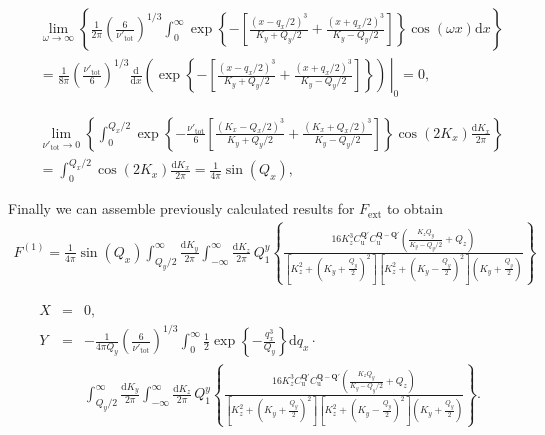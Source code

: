 \documentclass[a4paper,11pt]{article}
\begin{document}
\begin{eqnarray}
&& \lim_{\omega \rightarrow \infty} \left\{ \frac1{2\pi}\left(\frac{6}{\nu'_\mathrm{tot}}\right)^{1/3}\int_{0}^\infty \exp\left\{-\left[\frac{(x-q_x/2)^3}{K_y+Q_y/2}+\frac{(x+q_x/2)^3}{K_y-Q_y/2}\right]\right\} \cos(\omega x) \mathrm{d}x  \right\} \nonumber \\
&& {}= \frac1{8\pi} \left(\frac{\nu'_\mathrm{tot}}{6}\right)^{1/3} \left. \frac{\mathrm{d}}{\mathrm{d}x}  \left(\exp\left\{-\left[\frac{(x-q_x/2)^3}{K_y+Q_y/2}+\frac{(x+q_x/2)^3}{K_y-Q_y/2}\right]\right\}\right) \, \right|_0 = 0,
\end{eqnarray}

\begin{eqnarray}
&&\lim_{\nu'_{\mathrm{tot}} \rightarrow 0} \left\{ \int_0^{Q_x/2} \exp\left\{ -\frac{\nu'_{\mathrm{tot}}}{6}\left[\frac{(K_x-Q_x/2)^3}{K_y+Q_y/2}+\frac{(K_x+Q_x/2)^3}{K_y-Q_y/2}\right]\right\} \cos(2K_x) \frac{\mathrm{d}K_x}{2\pi} \right\} \nonumber\\
&& {}= \int_0^{Q_x/2} \cos(2K_x) \frac{\mathrm{d}K_x}{2\pi} = \frac1{4\pi}\sin(Q_x),
\end{eqnarray}



Finally we can assemble previously calculated results for $F_\mathrm{ext}$ to obtain
\begin{eqnarray*}
 F^{(1)} =  \frac1{4\pi}\sin(Q_x) \int_{Q_y/2}^\infty \frac{\mathrm{d}K_y}{2\pi} \int_{-\infty}^\infty \frac{\mathrm{d}K_z}{2\pi} \, Q_1^y 
  \left\{ \frac{16K_z^3 C_\mathrm{u}^{\mathbf{Q}'}C_\mathrm{u}^{\mathbf{Q-Q}'}  \left( \frac{K_z Q_y}{K_y - Q_y/2} + Q_z\right) }
  { \left[K_z^2 + \left(K_y+\frac{Q_y}2 \right)^2\right] \left[K_z^2 + \left(K_y - \frac{Q_y}2 \right)^2\right]\left(K_y +\frac{Q_y}2 \right) }  \right\}
\end{eqnarray*}


\begin{eqnarray*}
 X &=& 0,\nonumber \\
 Y &=& -\frac1{4\pi Q_y}\left(\frac6{\nu'_\mathrm{tot}}\right)^{1/3} \int_0^\infty \frac12 \exp\left\{-\frac{q_x^3}{Q_y} \right\} \mathrm{d}q_x \cdot \nonumber \\
 &&\int_{Q_y/2}^\infty \frac{\mathrm{d}K_y}{2\pi} \int_{-\infty}^\infty \frac{\mathrm{d}K_z}{2\pi} \, Q_1^y 
  \left\{ \frac{16K_z^3 C_\mathrm{u}^{\mathbf{Q}'}C_\mathrm{u}^{\mathbf{Q-Q}'}  \left( \frac{K_z Q_y}{K_y - Q_y/2} + Q_z\right) }
  { \left[K_z^2 + \left(K_y+\frac{Q_y}2 \right)^2\right] \left[K_z^2 + \left(K_y - \frac{Q_y}2 \right)^2\right]\left(K_y +\frac{Q_y}2 \right) }  \right\} .\nonumber
\end{eqnarray*}
\end{document}
